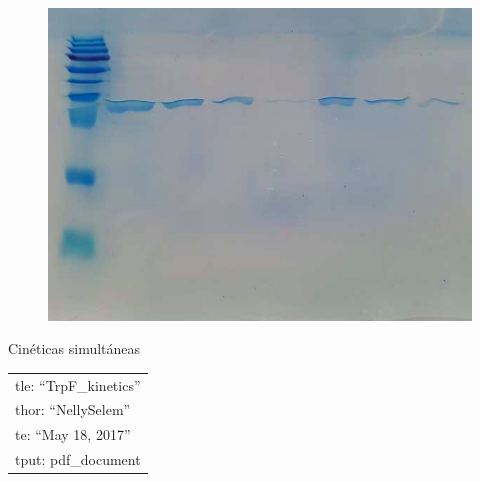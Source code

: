 \documentclass[12pt,twoside]{reedthesis}
\begin{document}
  \begin{figure}[h!tbp]
  \centering
  \includegraphics[angle = 0,scale = 0.6]{chapter4/Geles/PriAAbril30.png}
  \caption[gel]{\footnotesize{}}
  \label{fig:gel}
  \end{figure}
  
  Cinéticas simultáneas
  
  \begin{longtable}[]{@{}l@{}}
  \toprule
  tle: ``TrpF\_kinetics''\tabularnewline
  thor: ``NellySelem''\tabularnewline
  te: ``May 18, 2017''\tabularnewline
  tput: pdf\_document\tabularnewline
  \bottomrule
  \end{longtable}
  
\end{document}
